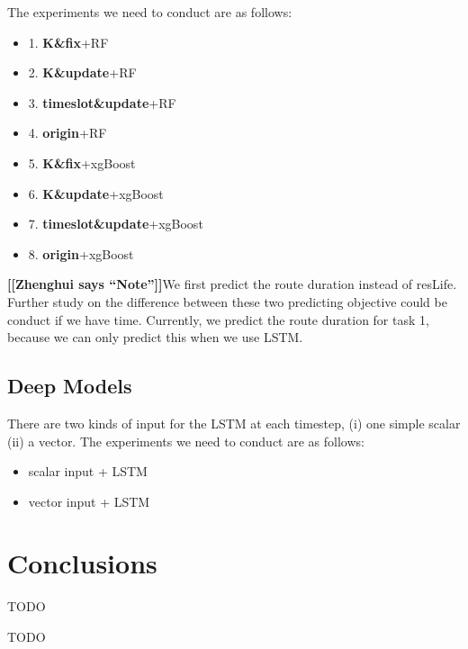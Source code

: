 \documentclass[sigconf]{acmart}
\newcommand{\hui}[1]{{\bf \color{purple} [[Zhenghui says ``#1'']]}}
\begin{document}
	The experiments we need to conduct are as follows:
	\begin{itemize}
		
		\item 1. \textbf{K\&fix}+RF
		\item 2. \textbf{K\&update}+RF
		\item 3. \textbf{timeslot\&update}+RF
		\item 4. \textbf{origin}+RF
		\item 5. \textbf{K\&fix}+xgBoost
		\item 6. \textbf{K\&update}+xgBoost
		\item 7. \textbf{timeslot\&update}+xgBoost
		\item 8. \textbf{origin}+xgBoost
	\end{itemize}
	
	
	\hui{Note}We first predict the route duration instead of resLife. Further study on the difference between these two predicting objective could be conduct if we have time. Currently, we predict the route duration for task 1, because we can only predict this when we use LSTM.
	
	
	\subsection{Deep Models}
	
	There are two kinds of input for the LSTM at each timestep, (i) one simple scalar (ii) a vector.
	The experiments we need to conduct are as follows:
	\begin{itemize}
		\item scalar input + LSTM
		\item vector input + LSTM
	\end{itemize}
	
	\section{Conclusions}
	TODO
	
	\begin{acks}
		TODO
	\end{acks}
	
	
	 
	
\end{document}
